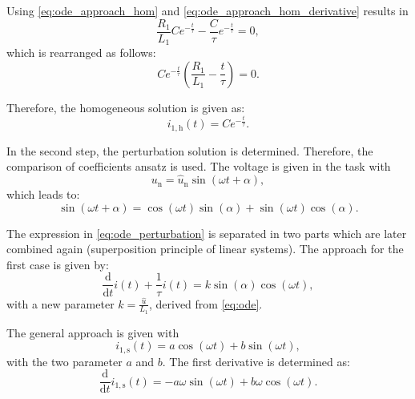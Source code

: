 \begin{solutionblock}
  Using \eqref{eq:ode_approach_hom} and \eqref{eq:ode_approach_hom_derivative} results in
  \begin{equation}
    \frac{R_{\mathrm{1}}}{L_{\mathrm{1}}} C e^{-\frac{t}{\tau}} - \frac{C}{\tau} e^{-\frac{t}{\tau}} = 0,
  \end{equation}
  which is rearranged as follows:
  \begin{equation}
    C e^{-\frac{t}{\tau}} \left(\frac{R_{\mathrm{1}}}{L_{\mathrm{1}}}-\frac{t}{\tau} \right)=0.
  \end{equation}


  Therefore, the homogeneous solution is given as:
  \begin{equation}
    i_{\mathrm{1,h}}(t) = C e^{-\frac{t}{\tau}}.
  \end{equation}
  

  In the second step, the perturbation solution is determined. Therefore, the comparison of coefficients ansatz is used.
  The voltage is given in the task with
  \begin{equation}
    u_{\mathrm{n}} = \hat{u}_{\mathrm{n}} \sin(\omega t + \alpha),
  \end{equation}
  which leads to:
  \begin{equation}
    \sin(\omega t + \alpha) = \cos(\omega t) \sin(\alpha) + \sin(\omega t) \cos(\alpha).
    \label{eq:ode_perturbation}
  \end{equation}

  The expression in \eqref{eq:ode_perturbation} is separated in two parts which are later combined again (superposition principle of linear systems). The approach for the first case is given by:
  \begin{equation}
    \frac{\mathrm{d}}{\mathrm{d}t}i(t) + \frac{1}{\tau}i(t) = k \sin(\alpha) \cos(\omega t),
  \end{equation}
  with a new parameter $k = \frac{\hat{u}}{L_{\mathrm{1}}}$, derived from \eqref{eq:ode}.

  The general approach is given with
  \begin{equation}
    i_{\mathrm{1,s}}(t) = a \cos(\omega t) + b \sin(\omega t),
    \label{eq:ode_approach_per}
  \end{equation}
  with the two parameter $a$ and $b$. The first derivative is determined as:
  \begin{equation}
    \frac{\mathrm{d}}{\mathrm{d}t} i_{\mathrm{1,s}}(t) = - a \omega \sin(\omega t) + b \omega \cos(\omega t).
    \label{eq:ode_approach_per_derivative}
  \end{equation}


\end{solutionblock}
